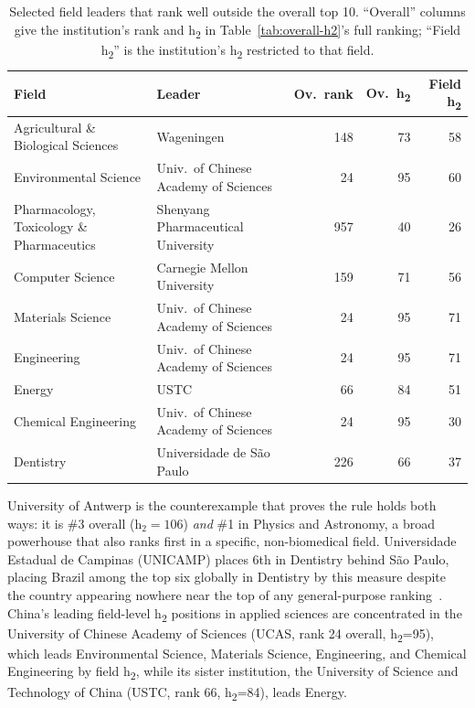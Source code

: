 \begin{table}[h]
	\centering
	\small
	\caption{Selected field leaders that rank well outside the overall top 10. ``Overall'' columns give the institution's rank and h\textsubscript{2} in Table~\ref{tab:overall-h2}'s full ranking; ``Field h\textsubscript{2}'' is the institution's h\textsubscript{2} restricted to that field.}
	\label{tab:field-leaders}
	\renewcommand{\arraystretch}{1.5}
	\begin{tabular}{@{}>{\raggedright\arraybackslash}p{2.5cm}>{\raggedright\arraybackslash}p{3.4cm}rrr@{}}
	\toprule
	Field & Leader & Ov.\ rank & Ov.\ h\textsubscript{2} & Field h\textsubscript{2} \\
	\midrule
	Agricultural \& Biological Sciences & Wageningen & 148 & 73 & 58 \\
	Environmental Science & Univ.\ of Chinese Academy of Sciences & 24 & 95 & 60 \\
	Pharmacology, Toxicology \& Pharmaceutics & Shenyang Pharmaceutical University & 957 & 40 & 26 \\
	Computer Science & Carnegie Mellon University & 159 & 71 & 56 \\
	Materials Science & Univ.\ of Chinese Academy of Sciences & 24 & 95 & 71 \\
	Engineering & Univ.\ of Chinese Academy of Sciences & 24 & 95 & 71 \\
	Energy & USTC & 66 & 84 & 51 \\
	Chemical Engineering & Univ.\ of Chinese Academy of Sciences & 24 & 95 & 30 \\
	Dentistry & Universidade de São Paulo & 226 & 66 & 37 \\
	\bottomrule
	\end{tabular}
	\renewcommand{\arraystretch}{1}
\end{table}

University of Antwerp is the counterexample that proves the rule holds both ways: it is \#3 overall ($\mathrm{h}_2=106$) \emph{and} \#1 in Physics and Astronomy, a broad powerhouse that also ranks first in a specific, non-biomedical field. Universidade Estadual de Campinas (UNICAMP) places 6th in Dentistry behind São Paulo, placing Brazil among the top six globally in Dentistry by this measure despite the country appearing nowhere near the top of any general-purpose ranking~\citep{vaccaro2022bibliometrics}. China's leading field-level h\textsubscript{2} positions in applied sciences are concentrated in the University of Chinese Academy of Sciences (UCAS, rank 24 overall, h\textsubscript{2}=95), which leads Environmental Science, Materials Science, Engineering, and Chemical Engineering by field h\textsubscript{2}, while its sister institution, the University of Science and Technology of China (USTC, rank 66, h\textsubscript{2}=84), leads Energy.


